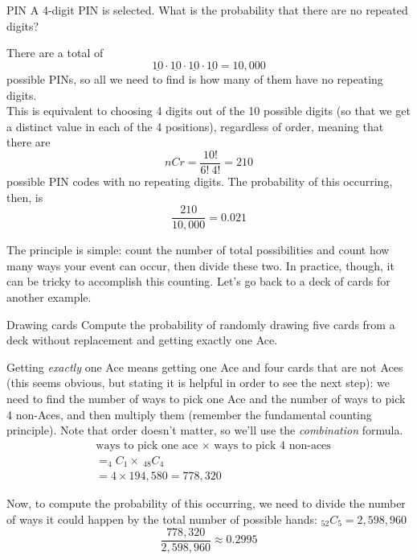 \begin{example}[https://www.youtube.com/watch?v=D_HPDTJlKNY]{PIN}
A 4-digit PIN is selected. What is the probability that there are no repeated digits?

\sol
There are a total of \[\underline{10} \cdot 
\underline{10} \cdot \underline{10} \cdot \underline{10} = 10,000\] possible PINs, so all we need to find is how many of them have no repeating digits.\\

This is equivalent to choosing 4 digits out of the 10 possible digits (so that we get a distinct value in each of the 4 positions), regardless of order, meaning that there are \[nCr = \dfrac{10!}{6! \ 4!} = 210\] possible PIN codes with no repeating digits.  The probability of this occurring, then, is \[\boxed{\dfrac{210}{10,000} = 0.021}\]
\end{example}

The principle is simple: count the number of total possibilities and count how many ways your event can occur, then divide these two.  In practice, though, it can be tricky to accomplish this counting.  Let's go back to a deck of cards for another example.
\pagebreak

\begin{example}[https://www.youtube.com/watch?v=QXyNszl3_h0]{Drawing cards}
Compute the probability of randomly drawing five cards from a deck without replacement and getting exactly one Ace.

\sol
Getting \textit{exactly} one Ace means getting one Ace and four cards that are not Aces (this seems obvious, but stating it is helpful in order to see the next step): we need to find the number of ways to pick one Ace and the number of ways to pick 4 non-Aces, and then multiply them (remember the fundamental counting principle).  Note that order doesn't matter, so we'll use the \textit{combination} formula.
\begin{align*}
&\textrm{ways to pick one ace } \times \textrm{ ways to pick 4 non-aces}\\
&= _4C_1 \times \ _{48}C_4\\
&= 4 \times 194,580 = 778,320
\end{align*}

Now, to compute the probability of this occurring, we need to divide the number of ways it could happen by the total number of possible hands: $_{52}C_5 = 2,598,960$
\[\boxed{\dfrac{778,320}{2,598,960} \approx 0.2995}\]
\end{example}

